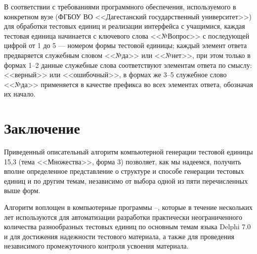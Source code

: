 В соответствии с требованиями программного обеспечения, используемого в конкретном вузе (ФГБОУ ВО <<Дагестанский государственный университет>>) для обработки тестовых единиц и реализации интерфейса с учащимися, каждая тестовая единица начинается с ключевого слова <<№Вопрос>> с последующей цифрой от 1 до 5 --- номером формы тестовой единицы; каждый элемент ответа предваряется служебным словом <<№да>> или <<№нет>>, при этом только в формах 1--2 данные служебные слова соответствуют элементам ответа по смыслу: <<верный>> или <<ошибочный>>, в формах же 3--5 служебное слово <<№да>> применяется в качестве префикса во всех элементах ответа, обозначая их начало.

\section{Заключение}

Приведенный описательный алгоритм компьютерной генерации тестовой единицы 15,3 (тема <<Множества>>, форма 3) позволяет, как мы надеемся, получить вполне определенное представление о структуре и способе генерации тестовых единиц и по другим темам, независимо от выбора одной из пяти перечисленных выше форм.

Алгоритм воплощен в компьютерные программы \cite{Mta}--\cite{Mam}, которые в течение нескольких лет используются для автоматизации разработки практически неограниченного количества разнообразных тестовых единиц по основным темам языка Delphi 7.0 и для достижения надежности тестового материала, а также для проведения независимого промежуточного контроля усвоения материала.
\par\medskip